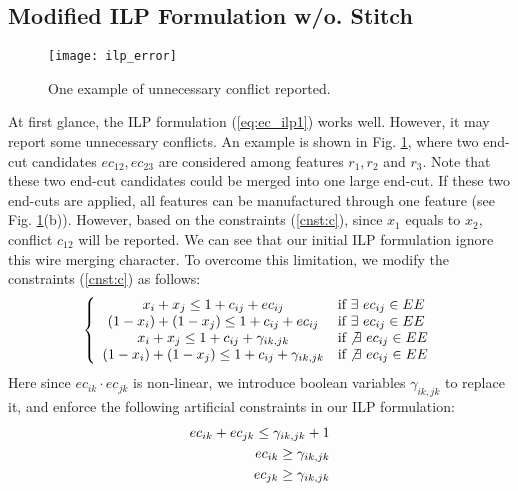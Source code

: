 \documentclass[12pt]{spieman}
\theoremstyle{plain}
\begin{document}
\begin{spacing}{1}
\iffalse
\subsection{Modified ILP Formulation w/o. Stitch}


\begin{figure}[htb]
  \centering
  \texttt{[image: ilp\_error]}
  \caption{One example of unnecessary conflict reported.}
  \label{fig:ilp_error}
\end{figure}

At first glance, the ILP formulation (\ref{eq:ec_ilp1}) works well.
However, it may report some unnecessary conflicts.
An example is shown in Fig. \ref{fig:ilp_error}, where two end-cut candidates $ec_{12}, ec_{23}$ are considered among features $r_1, r_2$ and $r_3$.
Note that these two end-cut candidates could be merged into one large end-cut.
If these two end-cuts are applied, all features can be manufactured through one feature (see Fig. \ref{fig:ilp_error}(b)).
However, based on the constraints (\ref{cnst:c}), since $x_1$ equals to $x_2$, conflict $c_{12}$ will be reported.
We can see that our initial ILP formulation ignore this wire merging character.
To overcome this limitation, we modify the constraints (\ref{cnst:c}) as follows:
\begin{equation}
  \label{cnst:c2}
	\left\{
	\begin{array}{cl}
		x_i + x_j \le 1 + c_{ij} + ec_{ij}                 & \textrm{if}\ \exists     \ ec_{ij} \in EE \\
    (1-x_i) + (1-x_j) \le 1 + c_{ij} + ec_{ij}         & \textrm{if}\ \exists     \ ec_{ij} \in EE \\
		x_i + x_j \le 1 + c_{ij} + \gamma_{ik,jk}          & \textrm{if}  \not\exists \ ec_{ij} \in EE \\
    (1-x_i) + (1-x_j) \le 1 + c_{ij} + \gamma_{ik,jk}  & \textrm{if}  \not\exists \ ec_{ij} \in EE 
	\end{array}
	\right.
\end{equation}
Here since $ec_{ik} \cdot ec_{jk}$ is non-linear, we introduce boolean variables $\gamma_{ik, jk}$ to replace it, and enforce the following artificial constraints in our ILP formulation:
\begin{align}
  ec_{ik} + ec_{jk} \le \gamma_{ik, jk} + 1      \notag\\
  ec_{ik} \ge \gamma_{ik, jk}                   \label{cnst:linear}\\
  ec_{jk} \ge \gamma_{ik, jk}                   \notag
\end{align}


\end{spacing}
\end{document}
